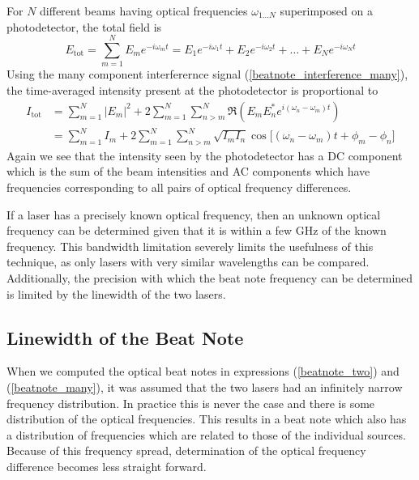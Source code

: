 For $N$ different beams having optical frequencies $\omega_{1\ldots N}$ superimposed on a photodetector, the total field is
\begin{equation}
	E_\mathrm{tot} = \sum_{m=1}^{N} E_m e^{-i\omega_m t} = E_1 e^{-i\omega_1 t} + E_2 e^{-i\omega_2 t} + \ldots + E_N e^{-i\omega_N t}
\end{equation}
Using the many component interferernce signal (\ref{beatnote_interference_many}), the time-averaged intensity present at the photodetector is proportional to
\begin{align} \label{beatnote_many}
	I_\mathrm{tot}
	&= \sum_{m=1}^{N} \left|E_m\right|^2 + 2 \sum_{m=1}^{N} \sum_{n>m}^{N}\Re \left(E_m E_n^* e^{i(\omega_n-\omega_m) t}\right) \nonumber \\
	&= \sum_{m=1}^{N} I_m + 2 \sum_{m=1}^{N} \sum_{n>m}^{N} \sqrt{I_m I_n} \cos \Big[(\omega_n-\omega_m) t + \phi_m - \phi_n\Big]
\end{align}
Again we see that the intensity seen by the photodetector has a DC component which is the sum of the beam intensities and AC components which have frequencies corresponding to all pairs of optical frequency differences.

If a laser has a precisely known optical frequency, then an unknown optical frequency can be determined given that it is within a few GHz of the known frequency. This bandwidth limitation severely limits the usefulness of this technique, as only lasers with very similar wavelengths can be compared. Additionally, the precision with which the beat note frequency can be determined is limited by the linewidth of the two lasers.

\subsection{Linewidth of the Beat Note}
When we computed the optical beat notes in expressions (\ref{beatnote_two}) and (\ref{beatnote_many}), it was assumed that the two lasers had an infinitely narrow frequency distribution. In practice this is never the case and there is some distribution of the optical frequencies. This results in a beat note which also has a distribution of frequencies which are related to those of the individual sources. Because of this frequency spread, determination of the optical frequency difference becomes less straight forward.

